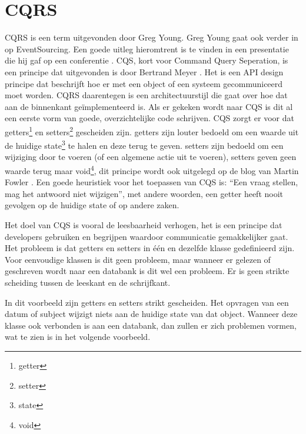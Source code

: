 
\chapter{CQRS}
\label{ch:CQRS}

\gls{CQRS} is een term uitgevonden door Greg Young. Greg Young gaat ook verder in op EventSourcing. Een goede uitleg hieromtrent is te vinden in een presentatie die hij gaf op een conferentie \autocite{Young2014CQRSandES}. \gls{CQS}, kort voor Command Query Seperation, is een principe dat uitgevonden is door Bertrand Meyer \autocite{Meyer1988}. Het is een API design principe dat beschrijft hoe er met een object of een systeem gecommuniceerd moet worden. CQRS daarentegen is een architectuurstijl die gaat over hoe dat aan de binnenkant geïmplementeerd is. Als er gekeken wordt naar \gls{CQS} is dit al een eerste vorm van goede, overzichtelijke code schrijven. \gls{CQS} zorgt er voor dat \glspl{getter}\footnote{\glsdesc{getter}} en \glspl{setter}\footnote{\glsdesc{setter}} gescheiden zijn. \Glspl{getter} zijn louter bedoeld om een waarde uit de huidige \gls{state}\footnote{\glsdesc{state}} te halen en deze terug te geven. \Glspl{setter} zijn bedoeld om een wijziging door te voeren (of een algemene actie uit te voeren), \glspl{setter} geven geen waarde terug maar \gls{void}\footnote{\glsdesc{void}}, dit principe wordt ook uitgelegd op de blog van Martin Fowler \autocite{Fowler2005CQS}. Een goede heuristiek voor het toepassen van \gls{CQS} is: ``Een vraag stellen, mag het antwoord niet wijzigen'', met andere woorden, een \gls{getter} heeft nooit gevolgen op de huidige \gls{state} of op andere zaken.

Het doel van \gls{CQS} is vooral de leesbaarheid verhogen, het is een principe dat developers gebruiken en begrijpen waardoor communicatie gemakkelijker gaat.
Het probleem is dat \glspl{getter} en \glspl{setter} in één en dezelfde klasse gedefinieerd zijn. Voor eenvoudige klassen is dit geen probleem, maar wanneer er gelezen of geschreven wordt naar een databank is dit wel een probleem. Er is geen strikte scheiding tussen de leeskant en de schrijfkant.


In dit voorbeeld zijn \glspl{getter} en \glspl{setter} strikt gescheiden. Het opvragen van een datum of subject wijzigt niets aan de huidige \gls{state} van dat object. Wanneer deze klasse ook verbonden is aan een databank, dan zullen er zich problemen vormen, wat te zien is in het volgende voorbeeld.

